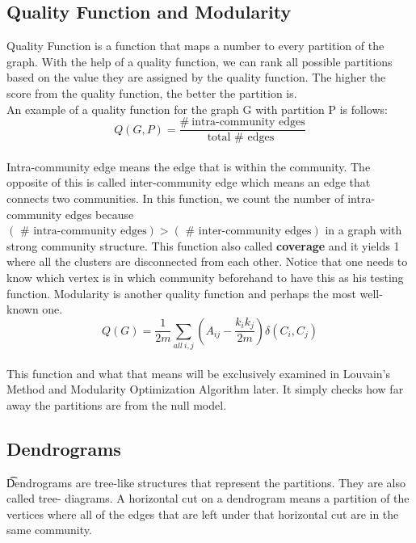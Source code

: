 \documentclass[10pt]{article}
\begin{document}
\subsection{Quality Function and Modularity}

Quality Function is a function that maps a number to every partition of the graph. With the help of a quality function, we can rank all possible partitions based on the value they are assigned by the quality function. The higher the score from the quality function, the better the partition is. \\

An example of a quality function for the graph G with partition P is follows: \\

\[ Q\left( G, P \right) = \frac{ \#\ \text{intra-community edges}  }{\text{total\ $\#$\ edges }  }   \] \\

Intra-community edge means the edge that is within the community. The opposite of this is called inter-community edge which means an edge that connects two communities. In this function, we count the number of intra-community edges because $\left( \text{ \#\ intra-community edges}\right) > \left(\text{ \#\ inter-community edges}\right)$ in a graph with strong community structure. This function also called \textbf{coverage} and it yields 1 where all the clusters are disconnected from each other. Notice that one needs to know which vertex is in which community beforehand to have this as his testing function.
Modularity is another quality function and perhaps the most well-known one. \\
\[ Q\left(G\right) = \frac{1}{2m}  \sum_{all\ i,j} \left( A_{ij} - \frac{k_i k_j}{2m} \right)  \delta \left( C_i, C_j\right) \] \\
This function and what that means will be exclusively examined in Louvain’s Method and Modularity Optimization Algorithm later. It simply checks how far away the partitions are from the null model.

\subsection{Dendrograms}

\t Dendrograms are tree-like structures that represent the partitions. They are also called tree- diagrams. A horizontal cut on a dendrogram means a partition of the vertices where all of the edges that are left under that horizontal cut are in the same community. \\
\end{document}
